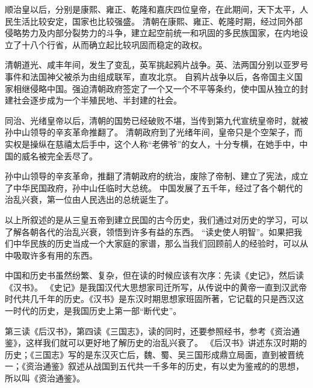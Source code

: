 \documentclass[avery5371,grid]{flashcards}
\begin{document}
{顺治皇以后，分别是康熙、雍正、乾隆和嘉庆四位皇帝，在此期间，天下太平，人民生活比较安定，国家也比较强盛。} %
{清朝在康熙、雍正、乾隆时期，经过同外部侵略势力及内部分裂势力的斗争，建立起空前统一和巩固的多民族国家，在内地设立了十八个行省，从而确立起比较巩固而稳定的政权。} %

{清朝道光、咸丰年间，发生了变乱，英军挑起鸦片战争。英、法两国分别以亚罗号事件和法国神父被杀为由组成联军，直攻北京。} %
{自鸦片战争以后，各帝国主义国家相继侵略中国。强迫清朝政府签定了一个又一个不平等条约，使中国从独立的封建社会逐步成为一个半殖民地、半封建的社会。} %

{同治、光绪皇帝以后，清朝的国势已经破败不堪，当传到第九代宣统皇帝时，就被孙中山领导的辛亥革命推翻了。} %
{清朝政府到了光绪年间，皇帝只是个空架子，而实权是操纵在慈禧太后手中，这个人称“老佛爷”的女人，十分专横，在她手中，中国的威名被完全丢尽了。} %

{孙中山领导的辛亥革命，推翻了清朝政府的统治，废除了帝制、建立了宪法，成立了中华民国政府，孙中山任临时大总统。} %
{中国发展了五千年，经过了各个朝代的治乱兴衰，第一位由人民选出的总统诞生了。} %


{以上所叙述的是从三皇五帝到建立民国的古今历史，我们通过对历史的学习，可以了解各朝各代的治乱兴衰，领悟到许多有益的东西。} %
{“读史使人明智”。如果把我们中华民族的历史当成一个大家庭的家谱，那么当我们回顾前人的经验时，可以从中吸取许多有用的东西。} %


{中国和历史书虽然纷繁、复杂，但在读的时候应该有次序：先读《史记》，然后读《汉书》。} %
{《史记》是我国汉代大思想家司迁所写，从传说中的黄帝一直到汉武帝时代共几千年的历史。《汉书》是东汉时期思想家班固所著，它记载的只是西汉这一时代的历史，是我国历史上第一部“断代史”。} %

{第三读《后汉书》，第四读《三国志》，读的同时，还要参照经书，参考《资治通鉴》，这样我们就可以更好地了解历史的治乱兴衰了。} %
{《后汉书》讲述东汉时期的历史；《三国志》写的是东汉灭亡后，魏、蜀、吴三国形成鼎立局面，直到被晋统一；《资治通鉴》叙述从战国到五代共一千多年的历史，有以史为鉴戒的的思想，所以叫《资治通鉴》。} %
\end{document}
